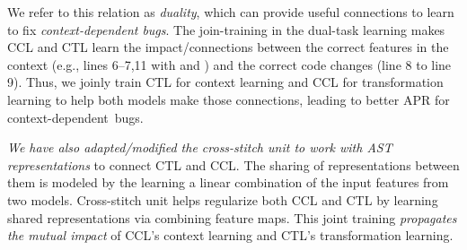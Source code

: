 We refer to this relation as {\em duality}, which can provide useful
connections to learn to fix {\em context-dependent
  bugs}.
The join-training in the dual-task learning makes CCL and CTL learn
the impact/connections between the correct features in the context
(e.g., lines 6--7,11 with  and )
and the correct code changes (line 8 to line 9). Thus, we
joinly train CTL for context learning and CCL for transformation
learning to help both models make those connections, leading to better
APR for context-dependent~bugs.


{\em We have also adapted/modified the cross-stitch
    unit \cite{misra2016cross} to work with AST representations} to
connect CTL and CCL. The sharing of representations between them is
modeled by the learning a linear combination of the input features
from two models. Cross-stitch unit helps regularize both CCL and CTL
by learning shared representations via combining feature
maps.
This joint training {\em propagates the mutual impact} of
CCL's context learning and CTL's transformation learning.


